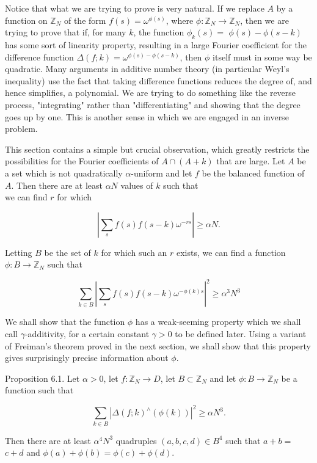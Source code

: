 \documentclass[10pt]{article}
\begin{document}
Notice that what we are trying to prove is very natural. If we replace $A$ by a function on $\mathbb{Z}_{N}$ of the form $f(s)=\omega^{\phi(s)}$, where $\phi: \mathbb{Z}_{N} \rightarrow \mathbb{Z}_{N}$, then we are trying to prove that if, for many $k$, the function $\phi_{k}(s)=$ $\phi(s)-\phi(s-k)$ has some sort of linearity property, resulting in a large Fourier coefficient for the difference function $\Delta(f ; k)=\omega^{\phi(s)-\phi(s-k)}$, then $\phi$ itself must in some way be quadratic. Many arguments in additive number theory (in particular Weyl's inequality) use the fact that taking difference functions reduces the degree of, and hence simplifies, a polynomial. We are trying to do something like the reverse process, "integrating" rather than "differentiating" and showing that the degree goes up by one. This is another sense in which we are engaged in an inverse problem.

This section contains a simple but crucial observation, which greatly restricts the possibilities for the Fourier coefficients of $A \cap(A+k)$ that are large. Let $A$ be a set which is not quadratically $\alpha$-uniform and let $f$ be the balanced function of $A$. Then there are at least $\alpha N$ values of $k$ such that\\
we can find $r$ for which

$$
\left|\sum_{s} f(s) f(s-k) \omega^{-r s}\right| \geqslant \alpha N .
$$

Letting $B$ be the set of $k$ for which such an $r$ exists, we can find a function $\phi: B \rightarrow \mathbb{Z}_{N}$ such that

$$
\sum_{k \in B}\left|\sum_{s} f(s) f(s-k) \omega^{-\phi(k) s}\right|^{2} \geqslant \alpha^{3} N^{3}
$$

We shall show that the function $\phi$ has a weak-seeming property which we shall call $\gamma$-additivity, for a certain constant $\gamma>0$ to be defined later. Using a variant of Freiman's theorem proved in the next section, we shall show that this property gives surprisingly precise information about $\phi$.

Proposition 6.1. Let $\alpha>0$, let $f: \mathbb{Z}_{N} \rightarrow D$, let $B \subset \mathbb{Z}_{N}$ and let $\phi: B \rightarrow \mathbb{Z}_{N}$ be a function such that

$$
\sum_{k \in B}\left|\Delta(f ; k)^{\wedge}(\phi(k))\right|^{2} \geqslant \alpha N^{3} .
$$

Then there are at least $\alpha^{4} N^{3}$ quadruples $(a, b, c, d) \in B^{4}$ such that $a+b=$ $c+d$ and $\phi(a)+\phi(b)=\phi(c)+\phi(d)$.
\end{document}
